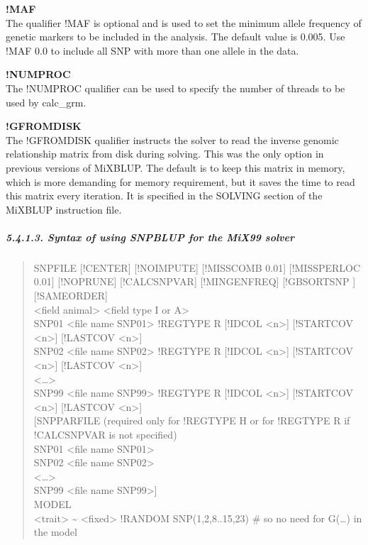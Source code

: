 \textbf{!MAF }\\
The qualifier !MAF is optional and is used to set the minimum allele
frequency of genetic markers to be included in the analysis. The default
value is 0.005. Use !MAF 0.0 to include all SNP with more than one
allele in the data.

\textbf{!NUMPROC}\\
The !NUMPROC qualifier can be used to specify the number of threads to
be used by calc\_grm.

\textbf{!GFROMDISK}\\
The !GFROMDISK qualifier instructs the solver to read the inverse
genomic relationship matrix from disk during solving. This was the only
option in previous versions of MiXBLUP. The default is to keep this
matrix in memory, which is more demanding for memory requirement, but it
saves the time to read this matrix every iteration. It is specified in
the SOLVING section of the MiXBLUP instruction file.

\subparagraph{5.4.1.3. Syntax of using SNPBLUP for the MiX99
solver}\label{Gene33}

\begin{quote}
SNPFILE {[}!CENTER{]} {[}!NOIMPUTE{]} {[}!MISSCOMB 0.01{]}
{[}!MISSPERLOC 0.01{]} {[}!NOPRUNE{]} {[}!CALCSNPVAR{]}
{[}!MINGENFREQ{]} {[}!GBSORTSNP {]} {[}!SAMEORDER{]}\\
\textless field animal\textgreater{} \textless field type I or
A\textgreater{}\\
SNP01 \textless file name SNP01\textgreater{} !REGTYPE R {[}!IDCOL
\textless n\textgreater{]} {[}!STARTCOV \textless n\textgreater{]}
{[}!LASTCOV \textless n\textgreater{]}\\
SNP02 \textless file name SNP02\textgreater{} !REGTYPE R {[}!IDCOL
\textless n\textgreater{]} {[}!STARTCOV \textless n\textgreater{]}
{[}!LASTCOV \textless n\textgreater{]}\\
\textless\ldots\textgreater{}\\
SNP99 \textless file name SNP99\textgreater{} !REGTYPE R {[}!IDCOL
\textless n\textgreater{]} {[}!STARTCOV \textless n\textgreater{]}
{[}!LASTCOV \textless n\textgreater{]}\\
{[}SNPPARFILE (required only for !REGTYPE H or for !REGTYPE R if
!CALCSNPVAR is not specified)\\
SNP01 \textless file name SNP01\textgreater{}\\
SNP02 \textless file name SNP02\textgreater{}\\
\textless\ldots\textgreater{}\\
SNP99 \textless file name SNP99\textgreater{]}\\
MODEL\\
\textless trait\textgreater{} \textasciitilde{}
\textless fixed\textgreater{} !RANDOM SNP(1,2,8..15,23) \# so no need
for G(\ldots) in the model
\end{quote}

